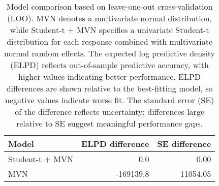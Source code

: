 \begin{table}

\caption{Model comparison based on leave-one-out cross-validation (LOO).  MVN denotes a multivariate normal distribution, while Student-t $+$ MVN specifies a univariate Student-t distribution for each response combined with multivariate normal random effects.
  The expected log predictive density (ELPD) reflects out-of-sample predictive accuracy, with higher values indicating better performance. ELPD differences are shown relative to the best-fitting model, so negative values indicate worse fit. The standard error (SE) of the difference reflects uncertainty; differences large relative to SE suggest meaningful performance gaps.}
\centering
\begin{tabular}[t]{lrr}
\toprule
Model & ELPD difference & SE difference\\
\midrule
Student-t $+$ MVN & 0.0 & 0.00\\
MVN & -169139.8 & 11054.05\\
\bottomrule
\end{tabular}
\end{table}
